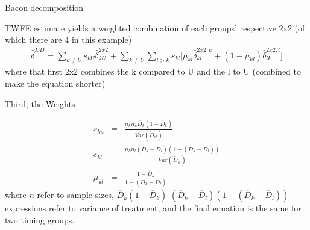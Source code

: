 \documentclass{beamer}
\begin{document}


	

\begin{frame}{Bacon decomposition}


TWFE estimate yields a weighted combination of each groups' respective 2x2 (of which there are 4 in this example)
\begin{eqnarray*}	
\widehat{\delta}^{DD} = \sum_{k \neq U} s_{kU}\widehat{\delta}_{kU}^{2x2} + \sum_{k \neq U} \sum_{l>k} s_{kl}  \bigg [ \mu_{kl}\widehat{\delta}_{kl}^{2x2,k} + (1-\mu_{kl}) \widehat{\delta}_{lk}^{2x2,l} \bigg]
\end{eqnarray*}where that first 2x2 combines the k compared to U and the l to U (combined to make the equation shorter)

\end{frame}
	


\begin{frame}{Third, the Weights}

 \begin{eqnarray*} s_{ku} &=& \frac{ n_k n_u \overline{D}_k (1- \overline{D}_k ) }{ \widehat{Var} ( \tilde{D}_{it} )} \\
s_{kl} &=& \frac{ n_k n_l (\overline{D}_k - \overline{D}_{l} ) ( 1- ( \overline{D}_k - \overline{D}_{l} )) }{\widehat{Var}(\tilde{D}_{it})} \\
\mu_{kl} &=& \frac{1 - \overline{D}_k }{1 - ( \overline{D}_k - \overline{D}_{l} )}
\end{eqnarray*}where $n$ refer to sample sizes, $\overline{D}_k (1- \overline{D}_k )$ $(\overline{D}_k - \overline{D}_{l} ) ( 1- ( \overline{D}_k - \overline{D}_{l} ))$ expressions refer to variance of treatment, and the final equation is the same for two timing groups.

\end{frame}
\end{document}
